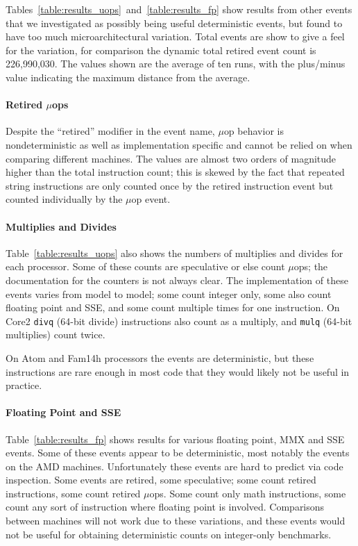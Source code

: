 Tables~\ref{table:results_uops}~and~\ref{table:results_fp} show results
from other events that we investigated as possibly being useful
deterministic events, but found to have too much microarchitectural
variation.  Total events are show to give a feel for the variation,
for comparison the dynamic total retired event count is
226,990,030.  The values shown are the average of ten runs, with
the plus/minus value indicating the maximum distance from the average.

\paragraph{Retired $\mu$ops}
Despite the ``retired'' modifier in the event name, 
$\mu$op behavior is nondeterministic as well as implementation
specific and cannot be relied on when comparing different machines.
The values are almost two orders of magnitude higher than the 
total instruction count; this is skewed by the fact that repeated
string instructions are only counted once by the retired instruction
event but counted individually by the $\mu$op event.

\paragraph{Multiplies and Divides}
Table~\ref{table:results_uops} also shows the numbers of 
multiplies and divides for each processor.  
Some of these counts are speculative or else count $\mu$ops; 
the documentation for the counters is not always clear.  
The implementation of these events varies from model to model;
some count integer only, some also count floating point and SSE, and some count
multiple times for one instruction.  
On Core2 {\tt divq} (64-bit divide) instructions also count as a multiply, 
and {\tt mulq} (64-bit multiplies) count twice.

On Atom and Fam14h processors the events are deterministic, but
these instructions are rare enough in most code that they
would likely not be useful in practice.

\paragraph{Floating Point and SSE}
Table~\ref{table:results_fp} shows results for various floating point,
MMX and SSE events.  Some of these events appear 
to be deterministic,
most notably the events on the AMD machines.  Unfortunately these events
are hard to predict via code inspection.  Some events are retired,
some speculative; some count retired instructions, some count retired
$\mu$ops.  Some count only math instructions, some count any sort
of instruction where floating point is involved.  Comparisons
between machines will not work due to these variations, and 
these events would not be useful for obtaining deterministic counts 
on integer-only benchmarks. 

